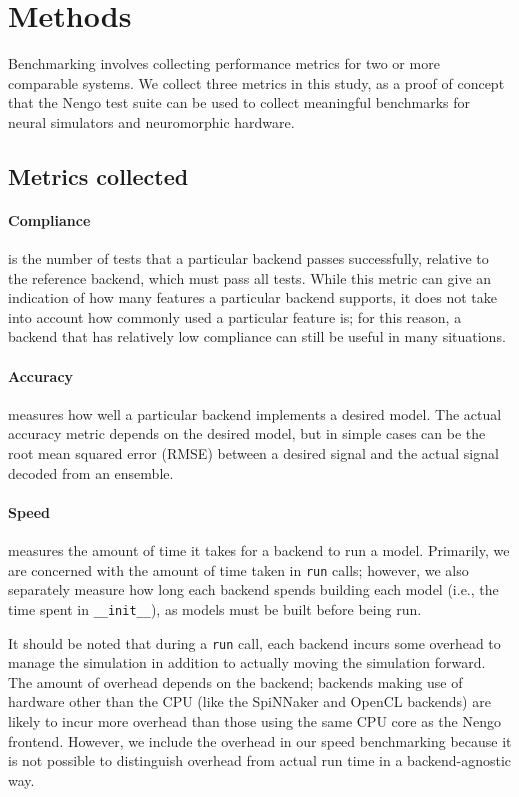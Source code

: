 \documentclass{frontiersSCNS}
\begin{document}
\section{Methods}

Benchmarking involves collecting performance metrics
for two or more comparable systems.
We collect three metrics in this study,
as a proof of concept that the Nengo test suite
can be used to collect meaningful benchmarks
for neural simulators and neuromorphic hardware.

\subsection{Metrics collected}
\label{Sec:Metrics}

\paragraph{Compliance}
is the number of tests that a particular backend
passes successfully, relative to the reference
backend, which must pass all tests.
While this metric can give an indication
of how many features a particular backend supports,
it does not take into account how commonly used
a particular feature is;
for this reason, a backend that has relatively
low compliance can still be useful
in many situations.

\paragraph{Accuracy}
measures how well a particular backend
implements a desired model.
The actual accuracy metric depends
on the desired model,
but in simple cases can be
the root mean squared error (RMSE)
between a desired signal
and the actual signal decoded
from an ensemble.

\paragraph{Speed}
measures the amount of time it takes
for a backend to run a model.
Primarily, we are concerned with
the amount of time taken
in \texttt{run} calls;
however, we also separately measure how long
each backend spends building each model
(i.e., the time spent in \texttt{\_\_init\_\_}),
as models must be built before being run.

It should be noted that
during a \texttt{run} call,
each backend incurs some overhead
to manage the simulation in addition
to actually moving the simulation forward.
The amount of overhead depends
on the backend; backends making use
of hardware other than the CPU
(like the SpiNNaker and OpenCL backends)
are likely to incur more overhead
than those using the same CPU core
as the Nengo frontend.
However, we include the overhead in
our speed benchmarking because
it is not possible to distinguish
overhead from actual run time
in a backend-agnostic way.
\end{document}
